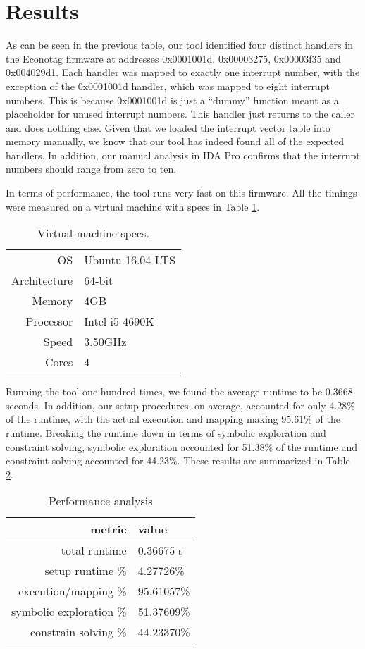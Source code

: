 \documentclass[letterpaper, 11 pt, conference]{ieeeconf}
\begin{document}
\section{Results} \label{results}
As can be seen in the previous table, our tool identified four distinct handlers in the Econotag firmware at addresses 0x0001001d, 0x00003275, 0x00003f35 and 0x004029d1. Each handler was mapped to exactly one interrupt number, with the exception of the 0x0001001d handler, which was mapped to eight interrupt numbers. This is because 0x0001001d is just a “dummy” function meant as a placeholder for unused interrupt numbers. This handler just returns to the caller and does nothing else. Given that we loaded the interrupt vector table into memory manually, we know that our tool has indeed found all of the expected handlers. In addition, our manual analysis in IDA Pro confirms that the interrupt numbers should range from zero to ten.

In terms of performance, the tool runs very fast on this firmware. All the timings were measured on a virtual machine with specs in Table \ref{table:vm}.

\begin{table}[h]
\centering
\begin{tabular}{r|l}
OS & Ubuntu 16.04 LTS \\
Architecture & 64-bit\\
Memory & 4GB\\
Processor &  Intel i5-4690K\\
Speed &  3.50GHz\\
Cores &  4\\
\end{tabular}
\caption{Virtual machine specs.}
\label{table:vm}
\end{table}

Running the tool one hundred times, we found the average runtime to be 0.3668 seconds. In addition, our setup procedures, on average, accounted for only 4.28\% of the runtime, with the actual execution and mapping making 95.61\% of the runtime. Breaking the runtime down in terms of symbolic exploration and constraint solving, symbolic exploration accounted for 51.38\% of the runtime and constraint solving accounted for 44.23\%. These results are summarized in Table \ref{table:time}.


\begin{table}[h]
\centering
\begin{tabular}{r|l}
metric & value \\ \hline
total runtime & 0.36675 s \\
setup runtime \% & 4.27726\% \\
execution/mapping \% & 95.61057\% \\
symbolic exploration \% & 51.37609\% \\
constrain solving \% & 44.23370\% \\
\end{tabular}
\caption{Performance analysis}
\label{table:time}
\end{table}
\end{document}
